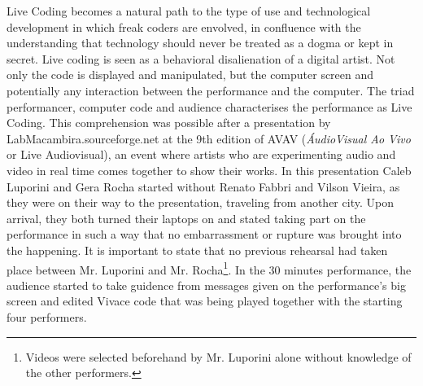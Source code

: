 \documentclass[letterpaper, 12pt]{article}
\begin{document}
Live Coding becomes a natural path to the type of use and
technological development in which freak coders are envolved, 
in confluence with the understanding that technology should never be
treated as a dogma or kept in secret. Live coding is seen as a
behavioral disalienation
of a digital artist. Not only the code is displayed and
manipulated, but the computer screen and potentially any interaction between the
performance and the computer. The triad performancer, computer code and
audience characterises the performance as Live
Coding.
This comprehension was possible after a presentation by LabMacambira.sourceforge.net
at the 9th edition of AVAV (\textit{\'{A}udioVisual Ao Vivo} or Live
Audiovisual), an event where artists who are experimenting audio and
video in real time comes together to show their works. In this
presentation Caleb Luporini and Gera Rocha started without Renato
Fabbri and Vilson Vieira, as they were on their way to the presentation,
traveling from another city. Upon arrival, they both turned their
laptops on and stated taking part on the performance in such a way
that no embarrassment or rupture was brought into the happening.
It is important to state that no previous rehearsal had taken place between
Mr. Luporini and Mr. Rocha\footnote{Videos were selected beforehand by Mr. Luporini
alone without knowledge of the other performers.}. In the 30 minutes
performance, the audience started to take guidence from messages given
on the performance's big screen and edited Vivace code that was being
played together with the starting four performers.



\end{document}
